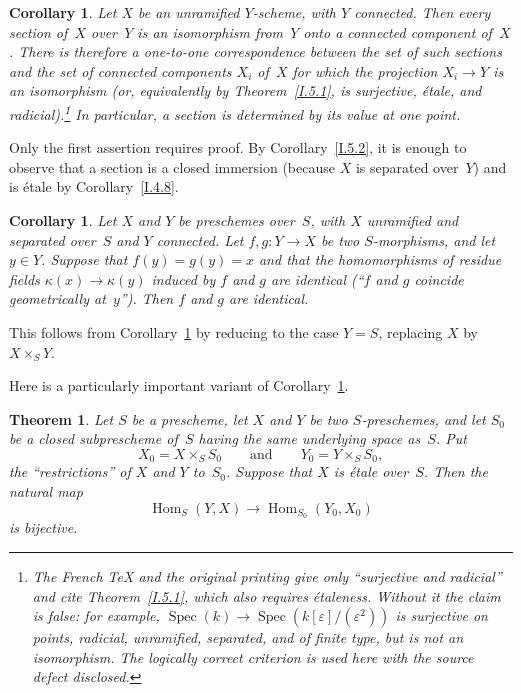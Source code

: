 \documentclass[11pt,oneside]{amsbook}
\newtheorem{theorem}[proposition]{Theorem}
\newtheorem{corollary}[proposition]{Corollary}
\begin{document}
%
\begin{corollary}
\label{I.5.3}
Let \(X\) be an unramified \(Y\)-scheme, with \(Y\) connected.  Then every
section of~\(X\) over~\(Y\) is an isomorphism from~\(Y\) onto a connected
component of~\(X\).  There is therefore a one-to-one correspondence
between the set of such sections and the set of connected components
\(X_i\) of~\(X\) for which the projection \(X_i\to Y\) is an isomorphism
(or, equivalently by Theorem~\ref{I.5.1}, is surjective, étale, and
radicial).\footnote{The French TeX and the original printing give only
``surjective and radicial'' and cite Theorem~\ref{I.5.1}, which also requires
étaleness.  Without it the claim is false: for example,
\(\operatorname{Spec}(k)\to
\operatorname{Spec}(k[\varepsilon]/(\varepsilon^2))\) is surjective on
points, radicial, unramified, separated, and of finite type, but is not an
isomorphism.  The logically correct criterion is used here with the source defect
disclosed.}
In particular, a section is determined by its value at one point.
\end{corollary}

Only the first assertion requires proof.  By Corollary~\ref{I.5.2}, it is
enough to observe that a section is a closed immersion (because \(X\) is
separated over~\(Y\)) and is étale by Corollary~\ref{I.4.8}.

\begin{corollary}
\label{I.5.4}
Let \(X\) and \(Y\) be preschemes over~\(S\), with \(X\) unramified and
separated over~\(S\) and \(Y\) connected.  Let \(f,g\colon Y\to X\) be
two \(S\)-morphisms, and let \(y\in Y\).  Suppose that
\(f(y)=g(y)=x\) and that the homomorphisms of residue fields
\(\kappa(x)\to\kappa(y)\) induced by \(f\) and \(g\) are identical
(``\(f\) and \(g\) coincide geometrically at~\(y\)'').  Then \(f\) and
\(g\) are identical.
\end{corollary}

This follows from Corollary~\ref{I.5.3} by reducing to the case \(Y=S\),
replacing \(X\) by \(X\times_S Y\).

Here is a particularly important variant of Corollary~\ref{I.5.3}.

\begin{theorem}
\label{I.5.5}
Let \(S\) be a prescheme, let \(X\) and \(Y\) be two \(S\)-preschemes,
and let \(S_0\) be a closed subprescheme of~\(S\) having the same
underlying space as~\(S\).  Put
\[
  X_0=X\times_S S_0
  \qquad\text{and}\qquad
  Y_0=Y\times_S S_0,
\]
the ``restrictions'' of \(X\) and \(Y\) to~\(S_0\).  Suppose that \(X\)
is étale over~\(S\).  Then the natural map
\[
  \operatorname{Hom}_S(Y,X)
  \longrightarrow
  \operatorname{Hom}_{S_0}(Y_0,X_0)
\]
is \emph{bijective}.
\end{theorem}
\end{document}

